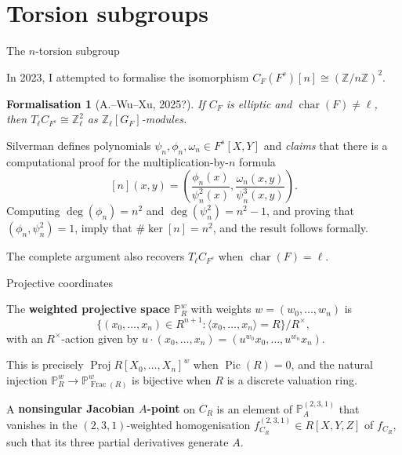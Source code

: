 \documentclass[10pt]{beamer}
\newtheorem{formalisation}{Formalisation}
\begin{document}
\section{Torsion subgroups}

\begin{frame}[t]{The $ n $-torsion subgroup}

In 2023, I attempted to formalise the isomorphism $ C_F(F^s)[n] \cong (\mathbb{Z} / n\mathbb{Z})^2 $.

\begin{formalisation}[A.--Wu--Xu, 2025?]
If $ C_F $ is elliptic and $ \operatorname{char}(F) \ne \ell $, then $ T_\ell C_{F^s} \cong \mathbb{Z}_\ell^2 $ as $ \mathbb{Z}_\ell[G_F] $-modules.
\end{formalisation}

Silverman defines polynomials $ \psi_n, \phi_n, \omega_n \in F^s[X, Y] $ and \emph{claims} that there is a computational proof for the multiplication-by-$ n $ formula
$$ [n](x, y) = \left(\dfrac{\phi_n(x)}{\psi_n^2(x)}, \dfrac{\omega_n(x, y)}{\psi_n^3(x, y)}\right). $$
Computing $ \deg(\phi_n) = n^2 $ and $ \deg(\psi_n^2) = n^2 - 1 $, and proving that $ (\phi_n, \psi_n^2) = 1 $, imply that $ \#\ker[n] = n^2 $, and the result follows formally.

\vspace{0.5cm} The complete argument also recovers $ T_\ell C_{F^s} $ when $ \operatorname{char}(F) = \ell $.

\end{frame}

\begin{frame}[t]{Projective coordinates}

\begin{definition}
The \textbf{weighted projective space} $ \mathbb{P}_R^w $ with weights $ w = (w_0, \dots, w_n) $ is
$$ \{(x_0, \dots, x_n) \in R^{n + 1} : \langle x_0, \dots, x_n\rangle = R\} / R^\times, $$
with an $ R^\times $-action given by $ u \cdot (x_0, \dots, x_n) = (u^{w_0}x_0, \dots, u^{w_n}x_n) $.
\end{definition}

This is precisely $ \operatorname{Proj} R[X_0, \dots, X_n]^w $ when $ \operatorname{Pic}(R) = 0 $, and the natural injection $ \mathbb{P}_R^w \to \mathbb{P}_{\operatorname{Frac}(R)}^w $ is bijective when $ R $ is a discrete valuation ring.

\begin{definition}
A \textbf{nonsingular Jacobian $ A $-point} on $ C_R $ is an element of $ \mathbb{P}_A^{(2, 3, 1)} $ that vanishes in the $ (2, 3, 1) $-weighted homogenisation $ f_{C_R}^{(2, 3, 1)} \in R[X, Y, Z] $ of $ f_{C_R} $, such that its three partial derivatives generate $ A $.
\end{definition}

\end{frame}
\end{document}
